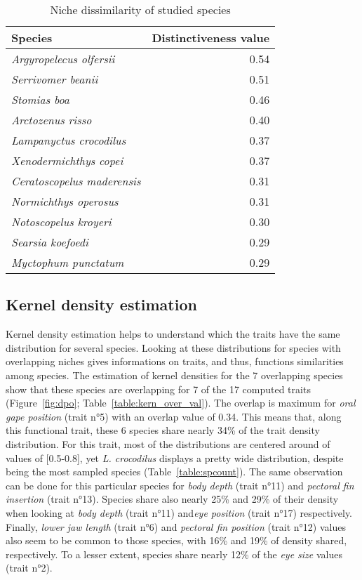 \begin{table}[!htbp]
\centering
\caption[Dissimilarity values of species' niches]{Niche dissimilarity of studied species}
\label{table:nich_diss}
\begin{adjustbox}{max width=1.1\textwidth,center}
\begin{tabular}{lr}
  \toprule
Species & Distinctiveness value \\ 
  \midrule
  \emph{Argyropelecus olfersii} & 0.54 \\ 
  \emph{Serrivomer beanii} & 0.51 \\ 
  \emph{Stomias boa} & 0.46 \\ 
  \emph{Arctozenus risso} & 0.40 \\ 
  \emph{Lampanyctus crocodilus} & 0.37 \\ 
  \emph{Xenodermichthys copei} & 0.37 \\ 
  \emph{Ceratoscopelus maderensis} & 0.31 \\ 
  \emph{Normichthys operosus} & 0.31 \\ 
  \emph{Notoscopelus kroyeri} & 0.30 \\ 
  \emph{Searsia koefoedi} & 0.29 \\ 
  \emph{Myctophum punctatum} & 0.29 \\  
   \bottomrule
\end{tabular}
\end{adjustbox}
\end{table}



\subsection{Kernel density estimation}
Kernel density estimation helps to understand which the traits have the same distribution for several species. Looking at these distributions for species with overlapping niches gives informations on traits, and thus, functions similarities among species. The estimation of kernel densities for the 7 overlapping species show that these species are overlapping for 7 of the 17 computed traits (Figure~\ref{fig:dpo}; Table~\ref{table:kern_over_val}). The overlap is maximum for \emph{oral gape position} (trait n°5) with an overlap value of 0.34. This means that, along this functional trait, these 6 species share nearly 34\% of the trait density distribution. For this trait, most of the distributions are centered around of values of [0.5-0.8], yet \textit{L. crocodilus} displays a pretty wide distribution, despite being the most sampled species (Table~\ref{table:spcount}). The same observation can be done for this particular species for \emph{body depth} (trait n°11) and \emph{pectoral fin insertion} (trait n°13). Species share also nearly 25\% and 29\% of their density when looking at \emph{body depth} (trait n°11) and\emph{eye position} (trait n°17) respectively. Finally, \emph{lower jaw length} (trait n°6) and \emph{pectoral fin position} (trait n°12) values also seem to be common to those species, with 16\% and 19\% of density shared, respectively. To a lesser extent, species share nearly 12\% of the \emph{eye size} values (trait n°2).

